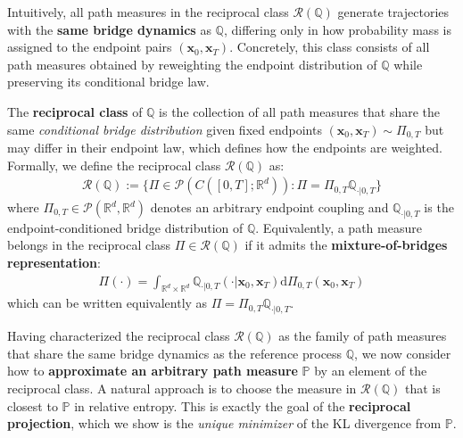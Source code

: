 \documentclass{article}
\newcommand{\boldtext}[1]{\textbf{\textcolor{MyGreen}{#1}}}
\begin{document}
Intuitively, all path measures in the reciprocal class $\mathcal{R}(\mathbb{Q})$ generate trajectories with the \textbf{same bridge dynamics} as $\mathbb{Q}$, differing only in how probability mass is assigned to the endpoint pairs $(\boldsymbol{x}_0,\boldsymbol{x}_T)$. Concretely, this class consists of all path measures obtained by reweighting the endpoint distribution of $\mathbb{Q}$ while preserving its conditional bridge law. 

\begin{definition}\label{def:reciprocal-class}
The \textbf{reciprocal class} of $\mathbb{Q}$ is the collection of all path measures that share the same \textit{conditional bridge distribution} given fixed endpoints $(\boldsymbol{x}_0, \boldsymbol{x}_T)\sim \Pi_{0,T}$ but may differ in their endpoint law, which defines how the endpoints are weighted. Formally, we define the reciprocal class $\mathcal{R}(\mathbb{Q})$ as:
\begin{align}
    \mathcal{R}(\mathbb{Q}):=\{\Pi\in \mathcal{P}(C([0,T] ; \mathbb{R}^d)) :\Pi=\Pi_{0,T}\mathbb{Q}_{\cdot|0,T}\}
\end{align}
where $\Pi_{0,T}\in \mathcal{P}(\mathbb{R}^d, \mathbb{R}^d)$ denotes an arbitrary endpoint coupling and $\mathbb{Q}_{\cdot|0,T}$ is the endpoint-conditioned bridge distribution of $\mathbb{Q}$. Equivalently, a path measure belongs in the reciprocal class $\Pi\in \mathcal{R}(\mathbb{Q})$ if it admits the \textbf{mixture-of-bridges representation}:
\begin{align}
    \Pi(\cdot)=\int_{\mathbb{R}^d\times \mathbb{R}^d}\mathbb{Q}_{\cdot|0,T}(\cdot|\boldsymbol{x}_0, \boldsymbol{x}_T)\mathrm{d}\Pi_{0,T}(\boldsymbol{x}_0, \boldsymbol{x}_T)
\end{align}
which can be written equivalently as $\Pi=\Pi_{0,T}\mathbb{Q}_{\cdot|0,T}$.
\end{definition}

Having characterized the reciprocal class $\mathcal{R}(\mathbb{Q})$ as the family of path measures that share the same bridge dynamics as the reference process $\mathbb{Q}$, we now consider how to \textbf{approximate an arbitrary path measure} $\mathbb{P}$ by an element of the reciprocal class. A natural approach is to choose the measure in $\mathcal{R}(\mathbb{Q})$ that is closest to $\mathbb{P}$ in relative entropy. This is exactly the goal of the \boldtext{reciprocal projection}, which we show is the \textit{unique minimizer} of the KL divergence from $\mathbb{P}$.
\end{document}
